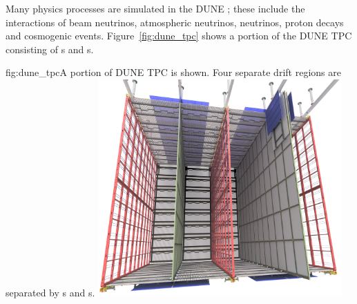 


Many physics processes are simulated in the DUNE ; these include the interactions of beam neutrinos, atmospheric neutrinos,  neutrinos, proton decays and cosmogenic events. Figure~\ref{fig:dune_tpc} shows a portion of the DUNE \single TPC consisting of s and s.

\begin{dunefigure}{fig:dune_tpc}{A portion of DUNE \single TPC is shown. Four separate drift regions are separated by s and s.}
\includegraphics[width=0.7\textwidth]{graphics/dune_sp_fd.jpg}
\end{dunefigure}

